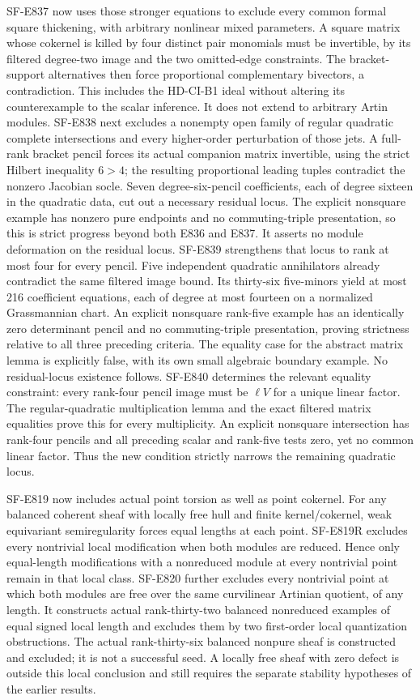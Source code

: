 \documentclass[11pt]{article}
\theoremstyle{remark}\newtheorem{remark}[theorem]{Remark}
\begin{document}
SF-E837 now uses those stronger equations to exclude every common
formal square thickening, with arbitrary nonlinear mixed parameters.
A square matrix whose cokernel is killed by four distinct pair
monomials must be invertible, by its filtered degree-two image and
the two omitted-edge constraints. The bracket-support alternatives
then force proportional complementary bivectors, a contradiction.
This includes the HD-CI-B1 ideal without altering its counterexample
to the scalar inference. It does not extend to arbitrary Artin modules.
SF-E838 next excludes a nonempty open family of regular quadratic
complete intersections and every higher-order perturbation of those
jets. A full-rank bracket pencil forces its actual companion matrix
invertible, using the strict Hilbert inequality $6>4$; the resulting
proportional leading tuples contradict the nonzero Jacobian socle.
Seven degree-six-pencil coefficients, each of degree sixteen in the
quadratic data, cut out a necessary residual locus. The explicit
nonsquare example has nonzero pure endpoints and no commuting-triple
presentation, so this is strict progress beyond both E836 and E837.
It asserts no module deformation on the residual locus.
SF-E839 strengthens that locus to rank at most four for every pencil.
Five independent quadratic annihilators already contradict the same
filtered image bound. Its thirty-six five-minors yield at most 216
coefficient equations, each of degree at most fourteen on a normalized
Grassmannian chart. An explicit nonsquare rank-five example has an
identically zero determinant pencil and no commuting-triple presentation,
proving strictness relative to all three preceding criteria. The equality
case for the abstract matrix lemma is explicitly false, with its own
small algebraic boundary example. No residual-locus existence follows.
SF-E840 determines the relevant equality constraint: every rank-four
pencil image must be $\ell V$ for a unique linear factor. The
regular-quadratic multiplication lemma and the exact filtered matrix
equalities prove this for every multiplicity. An explicit nonsquare
intersection has rank-four pencils and all preceding scalar and
rank-five tests zero, yet no common linear factor. Thus the new
condition strictly narrows the remaining quadratic locus.

SF-E819 now includes actual point torsion as well as point cokernel.
For any balanced coherent sheaf with locally free hull and finite
kernel/cokernel, weak equivariant semiregularity forces equal lengths
at each point. SF-E819R excludes every nontrivial local modification
when both modules are reduced. Hence only equal-length modifications
with a nonreduced module at every nontrivial point remain in that local
class. SF-E820 further excludes every nontrivial point at which both
modules are free over the same curvilinear Artinian quotient, of any
length. It constructs actual rank-thirty-two balanced nonreduced
examples of equal signed local length and excludes them by two
first-order local quantization obstructions. The actual rank-thirty-six balanced nonpure sheaf is constructed
and excluded; it is not a successful seed. A locally free sheaf with
zero defect is outside this local conclusion and still requires the
separate stability hypotheses of the earlier results.
\end{document}
